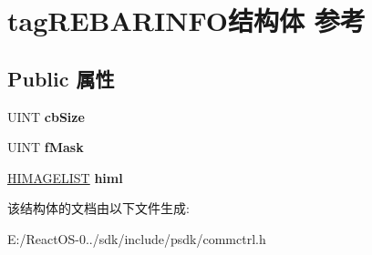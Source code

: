 \hypertarget{structtag_r_e_b_a_r_i_n_f_o}{}\section{tag\+R\+E\+B\+A\+R\+I\+N\+F\+O结构体 参考}
\label{structtag_r_e_b_a_r_i_n_f_o}
\subsection*{Public 属性}
\begin{DoxyCompactItemize}
\item 
\mbox{\label{structtag_r_e_b_a_r_i_n_f_o_a2dc9a2f19c11418e3a09fc61c7343fd7}} 
U\+I\+NT {\bfseries cb\+Size}
\item 
\mbox{\label{structtag_r_e_b_a_r_i_n_f_o_a82de517b6d9c24ecb398a0b2fd810d4f}} 
U\+I\+NT {\bfseries f\+Mask}
\item 
\mbox{\label{structtag_r_e_b_a_r_i_n_f_o_a32de5c150497d761533351d5c5aa1f65}} 
\hyperlink{struct___i_m_a_g_e_l_i_s_t}{H\+I\+M\+A\+G\+E\+L\+I\+ST} {\bfseries himl}
\end{DoxyCompactItemize}


该结构体的文档由以下文件生成\+:\begin{DoxyCompactItemize}
\item 
E\+:/\+React\+O\+S-\/0../sdk/include/psdk/commctrl.\+h\end{DoxyCompactItemize}
